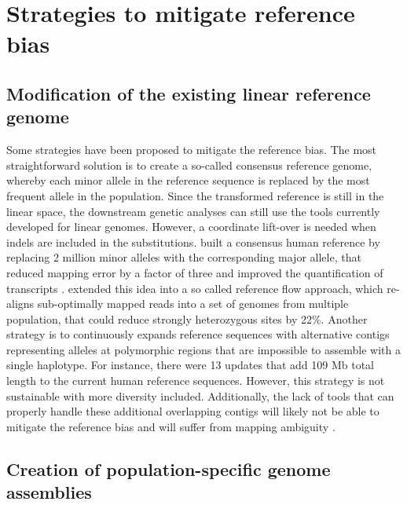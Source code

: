 \documentclass[../main.tex]{subfiles}
\begin{document}
\section{Strategies to mitigate reference bias}

\subsection*{Modification of the existing linear reference genome}

Some strategies have been proposed to mitigate the reference bias. The most straightforward solution is to create a so-called consensus reference genome, whereby each minor allele in the reference sequence is replaced by the most frequent allele in the population. Since the transformed reference is still in the linear space, the downstream genetic analyses can still use the tools currently developed for linear genomes. However, a coordinate lift-over is needed when indels are included in the substitutions. \citet{ballouz2019time} built a consensus human reference by replacing 2 million minor alleles with the corresponding major allele, that reduced mapping error by a factor of three and improved the quantification of transcripts \citep{kaminow2020virtue}. \citet{chen2021reference} extended this idea into a so called reference flow approach, which re-aligns sub-optimally mapped reads into a set of genomes from multiple population, that could reduce strongly heterozygous sites by 22\%. Another strategy is to continuously expands reference sequences with alternative contigs representing alleles at polymorphic regions that are impossible to assemble with a single haplotype. For instance, there were 13 updates that add 109 Mb total length to the current human reference sequences. However, this strategy is not sustainable with more diversity included. Additionally, the lack of tools that can properly handle these additional overlapping contigs will likely not be able to mitigate the reference bias and will suffer from mapping ambiguity \citep{sherman2020pan}. 

\subsection*{Creation of population-specific genome assemblies}
\end{document}
